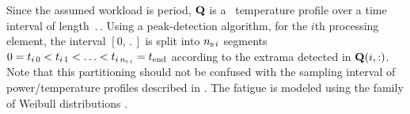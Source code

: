 Since the assumed workload is period, $\mQ$ is a \dss\ temperature profile over a time interval of length $\period$.
Using a peak-detection algorithm, for the $i$th processing element, the interval $[0, \period]$ is split into $\nsegments[\,i]$ segments $0 = \t_{i \, 0} < \t_{i \, 1} < \dotsc < \t_{i \, \nsegments[\,i]} = \period$ according to the extrama detected in $\mQ(i, :)$.
Note that this partitioning should not be confused with the sampling interval of power/temperature profiles described in .
The fatigue is modeled using the family of Weibull distributions \cite{ukhov2012, xiang2010}.
